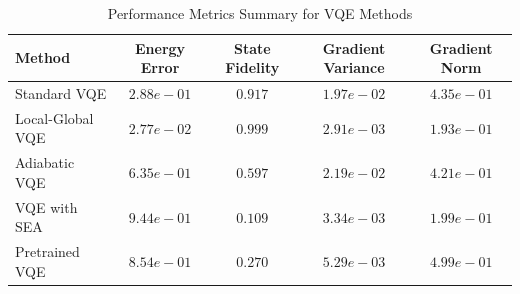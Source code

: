 \begin{table}[h!]
\centering
\caption{Performance Metrics Summary for VQE Methods}
\label{tab:performance_metrics}
\begin{tabular}{lcccc}
\hline
\textbf{Method} & \textbf{Energy Error} & \textbf{State Fidelity} & \textbf{Gradient Variance} & \textbf{Gradient Norm} \\
\hline
Standard VQE & $2.88e-01$ & $0.917$ & $1.97e-02$ & $4.35e-01$ \\
Local-Global VQE & $2.77e-02$ & $0.999$ & $2.91e-03$ & $1.93e-01$ \\
Adiabatic VQE & $6.35e-01$ & $0.597$ & $2.19e-02$ & $4.21e-01$ \\
VQE with SEA & $9.44e-01$ & $0.109$ & $3.34e-03$ & $1.99e-01$ \\
Pretrained VQE & $8.54e-01$ & $0.270$ & $5.29e-03$ & $4.99e-01$ \\
\hline
\end{tabular}
\end{table}